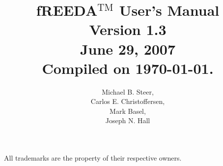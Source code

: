 \documentclass[12pt]{book}
\title{
{\sf \Huge fREEDA$^{\mathrm{TM}}$ User's Manual\\
\large Version 1.3}\\[1in]
June 29, 2007\\[0.5in]
Compiled on \today .
}
\author{Michael B. Steer, \\ Carlos E. Christoffersen, \\
Mark Basel, \\
Joseph N. Hall
}
\begin{document}
\maketitle
\newpage
\vspace*{\fill}
All trademarks are the property of their respective owners.
\tableofcontents












%

\end{document}
